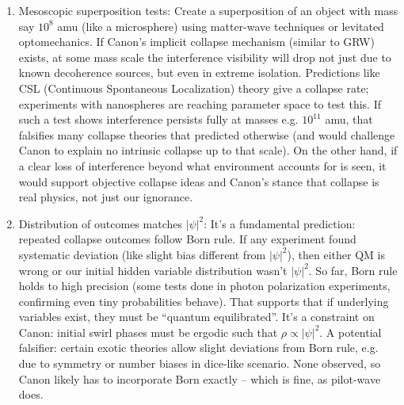 \documentclass[11pt]{article}
\begin{document}
\begin{enumerate}

\item 
Mesoscopic superposition tests: Create a superposition of an object with mass say $10^{8}$ amu (like a microsphere) using matter-wave techniques or levitated optomechanics. If Canon’s implicit collapse mechanism (similar to GRW) exists, at some mass scale the interference visibility will drop not just due to known decoherence sources, but even in extreme isolation. Predictions like CSL (Continuous Spontaneous Localization) theory give a collapse rate; experiments with nanospheres are reaching parameter space to test this. If such a test shows interference persists fully at masses e.g. $10^{11}$ amu, that falsifies many collapse theories that predicted otherwise (and would challenge Canon to explain no intrinsic collapse up to that scale). On the other hand, if a clear loss of interference beyond what environment accounts for is seen, it would support objective collapse ideas and Canon’s stance that collapse is real physics, not just our ignorance.




\item 
Distribution of outcomes matches $|\psi|^2$: It's a fundamental prediction: repeated collapse outcomes follow Born rule. If any experiment found systematic deviation (like slight bias different from $|\psi|^2$), then either QM is wrong or our initial hidden variable distribution wasn’t $|\psi|^2$. So far, Born rule holds to high precision (some tests done in photon polarization experiments, confirming even tiny probabilities behave). That supports that if underlying variables exist, they must be “quantum equilibrated”. It’s a constraint on Canon: initial swirl phases must be ergodic such that $\rho \propto |\psi|^2$. A potential falsifier: certain exotic theories allow slight deviations from Born rule, e.g. due to symmetry or number biases in dice-like scenario. None observed, so Canon likely has to incorporate Born exactly – which is fine, as pilot-wave does.





\end{enumerate}
\end{document}
